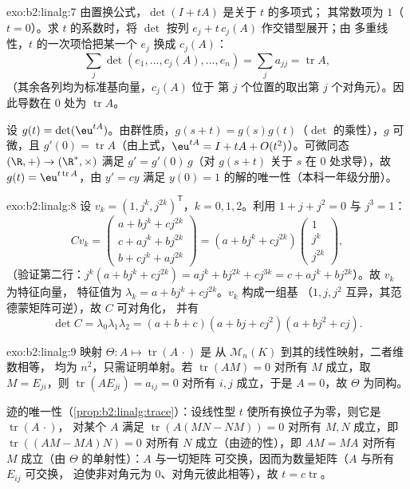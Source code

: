 \begin{solution}{exo:b2:linalg:7}
由置换公式，$\det(I + tA)$ 是关于 $t$ 的多项式；
其常数项为 $1$（$t = 0$）。求 $t$ 的系数时，将
$\det$ 按列 $e_j + t\,c_j(A)$ 作交错型展开；由
多重线性，$t$ 的一次项恰把某一个 $e_j$ 换成
$c_j(A)$：
\[
\sum_{j} \det(e_1, \dots, c_j(A), \dots, e_n)
= \sum_j a_{jj} = \operatorname{tr} A ,
\]
（其余各列均为标准基向量，$c_j(A)$ 位于
第 $j$ 个位置的取出第 $j$ 个对角元）。因此导数在 $0$ 处为
$\operatorname{tr} A$。

设 $g(t) = \det(\eu^{tA})$。由群性质，$g(s + t) =
g(s)g(t)$（$\det$ 的乘性），$g$ 可微，且
$g'(0) = \operatorname{tr} A$（由上式，$\eu^{tA} = I + tA +
O(t^2)$）。可微同态 $(\R, +) \to (\R^*, \times)$
满足 $g' = g'(0)\,g$（对 $g(s+t)$ 关于 $s$ 在 $0$ 处求导），故
$g(t) = \eu^{t\operatorname{tr} A}$，由
$y' = cy$ 满足 $y(0) = 1$ 的解的唯一性（本科一年级分册）。
\end{solution}

\begin{solution}{exo:b2:linalg:8}
设 $v_k = (1, j^k, j^{2k})^{\mathsf T}$，$k = 0, 1, 2$。利用 $1
+ j + j^2 = 0$ 与 $j^3 = 1$：
\[
C v_k =
\begin{pmatrix}
a + b j^k + c j^{2k}\\
c + a j^k + b j^{2k}\\
b + c j^k + a j^{2k}
\end{pmatrix}
= (a + b j^k + c j^{2k})
\begin{pmatrix} 1\\ j^k\\ j^{2k}\end{pmatrix},
\]
（验证第二行：$j^k(a + bj^k + cj^{2k}) = aj^k + bj^{2k} +
cj^{3k} = c + aj^k + bj^{2k}$）。故 $v_k$ 为特征向量，
特征值为 $\lambda_k = a + bj^k + cj^{2k}$。$v_k$ 构成一组基
（$1, j, j^2$ 互异，其范德蒙矩阵可逆），故 $C$ 可对角化，
并有
\[
\det C = \lambda_0\lambda_1\lambda_2
= (a+b+c)(a + bj + cj^2)(a + bj^2 + cj).
\]
\end{solution}

\begin{solution}{exo:b2:linalg:9}
映射 $\Theta \colon A \mapsto \operatorname{tr}(A\,\cdot)$ 是
从 $\mathcal{M}_n(K)$ 到其的线性映射，二者维数相等，
均为 $n^2$，只需证明单射。若 $\operatorname{tr}(AM) =
0$ 对所有 $M$ 成立，取 $M = E_{ji}$，则 $\operatorname{tr}(A E_{ji}) =
a_{ij} = 0$ 对所有 $i, j$ 成立，于是 $A = 0$，故 $\Theta$ 为同构。

迹的唯一性（\cref{prop:b2:linalg:trace}）：设线性型 $t$
使所有换位子为零，则它是 $\operatorname{tr}(A\,\cdot)$，
对某个 $A$ 满足 $\operatorname{tr}(A(MN - NM)) = 0$ 对所有 $M, N$ 成立，即
$\operatorname{tr}((AM - MA)N) = 0$ 对所有 $N$ 成立（由迹的性），即
$AM = MA$ 对所有 $M$ 成立（由 $\Theta$ 的单射性）：$A$ 与一切矩阵
可交换，因而为数量矩阵（$A$ 与所有 $E_{ij}$ 可交换，
迫使非对角元为 $0$、对角元彼此相等），故 $t = c
\operatorname{tr}$。
\end{solution}

